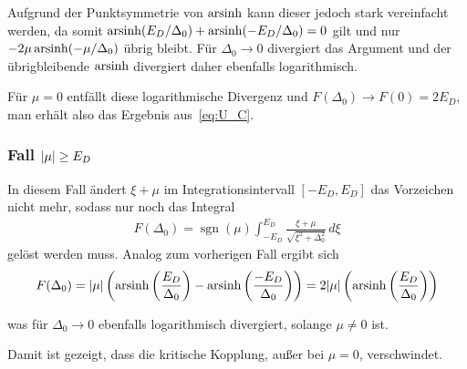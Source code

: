 Aufgrund der Punktsymmetrie von $\operatorname{arsinh}$ kann dieser jedoch stark vereinfacht werden, da somit $\operatorname{arsinh}(E_D/\Delta_0) + \operatorname{arsinh}(-E_D/\Delta_0) = 0$ gilt und nur $-2\mu \operatorname{arsinh}(-\mu/\Delta_0)$ übrig bleibt. Für $\Delta_0 \rightarrow 0$ divergiert das Argument und der übrigbleibende $\operatorname{arsinh}$ divergiert daher ebenfalls logarithmisch.

Für $\mu = 0$ entfällt diese logarithmische Divergenz und $F(\Delta_0) \rightarrow F(0) = 2E_D$, man erhält also das Ergebnis aus~\eqref{eq:U_C}.

\subsubsection{Fall $\abs{\mu} \geq E_D$}

In diesem Fall ändert $\xi + \mu$ im Integrationsintervall $[-E_D, E_D]$ das Vorzeichen nicht mehr, sodass nur noch das Integral
\begin{align}
    F(\Delta_0) = \operatorname{sgn}(\mu) \int_{-E_D}^{E_D} \frac{\xi + \mu}{\sqrt{\xi^2 + \Delta_0^2}}\, d\xi
\end{align}
gelöst werden muss. Analog zum vorherigen Fall ergibt sich
\begin{align}
    F(\Delta_0) = \abs{\mu} \left(\operatorname{arsinh}\left(\frac{E_D}{\Delta_0}\right) - \operatorname{arsinh}\left(\frac{-E_D}{\Delta_0}\right)\right) = 2\abs{\mu} \left(\operatorname{arsinh}\left(\frac{E_D}{\Delta_0}\right)\right)
\end{align}

was für $\Delta_0 \rightarrow 0$ ebenfalls logarithmisch divergiert, solange $\mu \neq 0$ ist.

Damit ist gezeigt, dass die kritische Kopplung, außer bei $\mu = 0$, verschwindet.